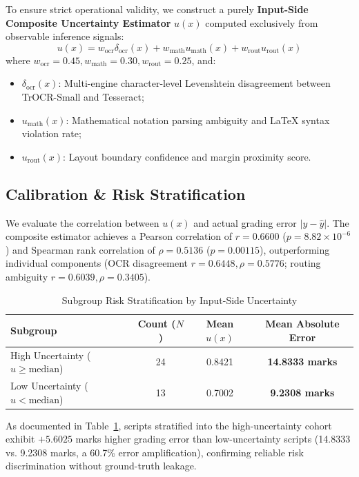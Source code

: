 \documentclass[journal]{IEEEtran}
\begin{document}
To ensure strict operational validity, we construct a purely \textbf{Input-Side Composite Uncertainty Estimator} $u(x)$ computed exclusively from observable inference signals:
\begin{equation}
u(x) = w_{\text{ocr}} \delta_{\text{ocr}}(x) + w_{\text{math}} u_{\text{math}}(x) + w_{\text{rout}} u_{\text{rout}}(x)
\end{equation}
where $w_{\text{ocr}} = 0.45, w_{\text{math}} = 0.30, w_{\text{rout}} = 0.25$, and:
\begin{itemize}
    \item $\delta_{\text{ocr}}(x)$: Multi-engine character-level Levenshtein disagreement between TrOCR-Small and Tesseract;
    \item $u_{\text{math}}(x)$: Mathematical notation parsing ambiguity and LaTeX syntax violation rate;
    \item $u_{\text{rout}}(x)$: Layout boundary confidence and margin proximity score.
\end{itemize}

\subsection{Calibration & Risk Stratification}
We evaluate the correlation between $u(x)$ and actual grading error $|y - \hat{y}|$. The composite estimator achieves a Pearson correlation of $r = 0.6600$ ($p = 8.82 \times 10^{-6}$) and Spearman rank correlation of $\rho = 0.5136$ ($p = 0.00115$), outperforming individual components (OCR disagreement $r = 0.6448, \rho = 0.5776$; routing ambiguity $r = 0.6039, \rho = 0.3405$).

\begin{table}[t]
\centering
\caption{Subgroup Risk Stratification by Input-Side Uncertainty}
\label{tab:risk_profile}
\begin{tabular}{lccc}
\toprule
\textbf{Subgroup} & \textbf{Count ($N$)} & \textbf{Mean $u(x)$} & \textbf{Mean Absolute Error} \\
\midrule
High Uncertainty ($u \ge \text{median}$) & 24 & 0.8421 & \textbf{14.8333 marks} \\
Low Uncertainty ($u < \text{median}$) & 13 & 0.7002 & \textbf{9.2308 marks} \\
\bottomrule
\end{tabular}
\end{table}

As documented in Table~\ref{tab:risk_profile}, scripts stratified into the high-uncertainty cohort exhibit $+5.6025$ marks higher grading error than low-uncertainty scripts (14.8333 vs. 9.2308 marks, a 60.7\% error amplification), confirming reliable risk discrimination without ground-truth leakage.
\end{document}
